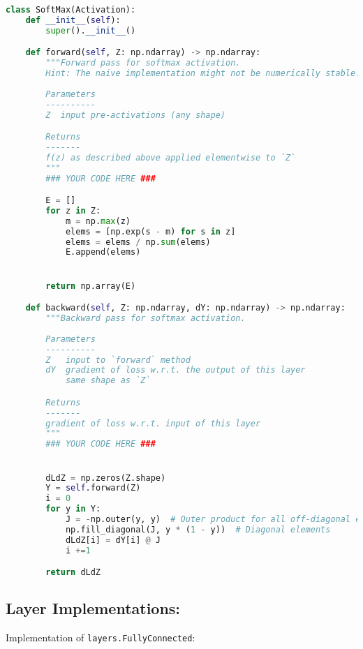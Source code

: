 \begin{lstlisting}[language=Python]
class SoftMax(Activation):
    def __init__(self):
        super().__init__()

    def forward(self, Z: np.ndarray) -> np.ndarray:
        """Forward pass for softmax activation.
        Hint: The naive implementation might not be numerically stable.
        
        Parameters
        ----------
        Z  input pre-activations (any shape)

        Returns
        -------
        f(z) as described above applied elementwise to `Z`
        """
        ### YOUR CODE HERE ###

        E = []
        for z in Z:
            m = np.max(z)
            elems = [np.exp(s - m) for s in z]
            elems = elems / np.sum(elems)
            E.append(elems)


        return np.array(E)

    def backward(self, Z: np.ndarray, dY: np.ndarray) -> np.ndarray:
        """Backward pass for softmax activation.
        
        Parameters
        ----------
        Z   input to `forward` method
        dY  gradient of loss w.r.t. the output of this layer
            same shape as `Z`

        Returns
        -------
        gradient of loss w.r.t. input of this layer
        """
        ### YOUR CODE HERE ###


        dLdZ = np.zeros(Z.shape)
        Y = self.forward(Z)
        i = 0
        for y in Y:
            J = -np.outer(y, y)  # Outer product for all off-diagonal elements
            np.fill_diagonal(J, y * (1 - y))  # Diagonal elements
            dLdZ[i] = dY[i] @ J
            i +=1

        return dLdZ

\end{lstlisting}


\subsection{Layer Implementations:}

Implementation of \texttt{layers.FullyConnected}:

